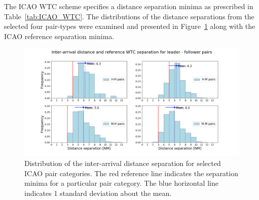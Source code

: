\begin{table}[h]
\centering
{}
\caption[BIKF traffic mix sorted into ICAO WTC]{Number of ICAO pairs from the traffic mix at BIKF during peak hours, arranged into the corresponding wake category. The majority of aircraft pairs comprise the M-M category (69,9\%), followed by M-H (14,3\%), H-M (12,9\%) and H-H (2,1\%) pairs. The observation period is from October 2017 to November 2018.}
\label{tab:pairs_mix_to_wtc}
\end{table}

The ICAO WTC scheme specifies a distance separation minima as prescribed in  Table~\ref{tab:ICAO_WTC}. The distributions of the distance separations from the selected four pair-types were examined and presented in Figure~\ref{fig:dist_separ_HH_HM_MH_MM_pairs} along with the ICAO reference separation minima. 

\begin{figure}[h]
    \centering
    \includegraphics[width=1\textwidth]{graphics/fig_dist_separ_HH_HM_MH_MM_pairs.png}
    \caption[Inter-arrival distance separation, main ICAO pairs]{Distribution of the inter-arrival distance separation for selected ICAO pair categories. The red reference line indicates the separation minima for a particular pair category. The blue horizontal line indicates 1 standard deviation about the mean.}
    \label{fig:dist_separ_HH_HM_MH_MM_pairs}
\end{figure}

